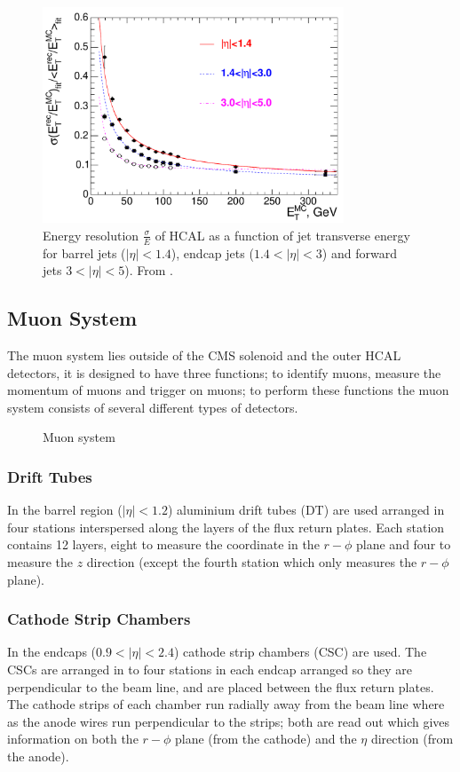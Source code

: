 \begin{figure}[htb!]
  \centering
  \includegraphics[width=0.8\textwidth]{hcal_performance}
  \caption{Energy resolution $\frac{\sigma}{E}$ of HCAL as a function of jet
  \label{fig:HCAL}
transverse energy for barrel jets ($|\eta| < 1.4$), endcap jets ($1.4<|\eta| <
3$) and forward jets $3<|\eta| < 5$). From \cite{cms}.}
\end{figure}


\subsection{Muon System}
The muon system lies outside of the CMS solenoid and the outer HCAL detectors,
it is designed to have three functions; to identify muons, measure the momentum
of muons and trigger on muons; to perform these functions the muon system
consists of several different types of detectors.

\begin{figure}[ht]
  \centering
  \caption{Muon system}
  \label{fig:muon_system}
\end{figure}

\subsubsection{Drift Tubes}
In the barrel region ($|\eta| < 1.2$) aluminium drift tubes (DT) are used
arranged in four stations interspersed along the layers of the flux return
plates. 
Each station contains 12 layers, eight to measure the coordinate in the
$r-\phi$ plane and four to measure the $z$ direction (except the fourth station
which only measures the $r-\phi$ plane). 

\subsubsection{Cathode Strip Chambers}
In the endcaps ($0.9<|\eta|<2.4$) cathode strip chambers (CSC) are used. The
CSCs are arranged in to four stations in each endcap arranged so they are
perpendicular to the beam line, and are placed between the flux return plates.
The cathode strips of each chamber run radially away from the beam line where
as the anode wires run perpendicular to the strips; both are read out which
gives information on both the $r-\phi$ plane (from the cathode) and the $\eta$
direction (from the anode). \cite{cms}

